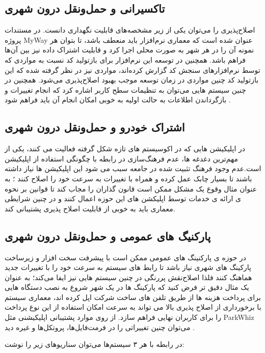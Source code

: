 \subsection{تاکسیرانی و حمل‌و‌نقل درون شهری}

اصلاح‌پذیری را می‌توان یکی از زیر مشخصه‌های قابلیت‌‌ نگهداری دانست. در مستندات پروژه MyWay عنوان شده است که معماری نرم‌افزار باید منعطف باشد، تا بتوان هر نمونه آن را در هر شهر به صورت محلی اجرا کرد و قابلیت اشتراک داده نیز بین آن‌‌ها فراهم باشد.
همچنین در توسعه این نرم‌افزار برای باز‌تولید کد نسبت به مواردی که توسط نرم‌افزارهای سنجش کد گزارش کرده‌اند، مواردی نیز در نظر گرفته شده که این باز‌تولید کد چنین مواردی در زمان توسعه موجب بهبود اصلاح‌پذیری می‌شود.
همچنین در چنین سیستم هایی می‌توان به تنظیمات سطح کاربر اشاره کرد که انجام تغییرات و بازگرداندن اطلاعات به حالت اولیه به خوبی امکان انجام آن باید فراهم شود \cite{myway_req}.

\subsection{اشتراک خودرو و حمل‌و‌نقل درون شهری}
در اپلیکیشن هایی که در اکوسیستم های تازه شکل گرفته فعالیت می کنند، یکی از مهم‌ترین دغدغه ها، عدم فرهنگ‌سازی در رابطه با چگونگی استفاده از اپلیکیشن است.عدم وجود فرهنگ تثبیت شده در جامعه سبب می شود این اپلیکیشن ها نیاز داشته باشند تا بسیار چابک عمل کرده و همراه با تغییرات به سرعت خود را اصلاح کنند \cite{carpool_dis}؛ به عنوان مثال وقوع یک مشکل ممکن است قانون گذاران را مجاب کند تا قوانین بر نحوه ی ارائه ی خدمات توسط اپلیکشن های این حوزه اعمال کنند و در چنین شرایطی معماری باید به خوبی از قابلیت اصلاح پذیری پشتیبانی کند. 


\subsection{پارکنیگ های عمومی و حمل‌و‌نقل درون شهری}
در حوزه ی پارکنینگ های عمومی ممکن است با پیشرفت سخت افزار و زیر‌ساخت پارکینگ های شهری نیاز باشد تا رابط های سیستم به سرعت خود را با تغییرات جدید هماهنگ کنند فلذا اصلاح‌نقش پررنگی در چنین سیستم هایی نیز ایفا می‌کند؛ به عنوان یک مثال دقیق تر فرض کنید که پارکینگ ها در یک شهر شروع به نصب دستگاه هایی برای پرداخت هزینه ها از طریق تلفن های ساخت شرکت اپل کرده اند، معماری سیستم با برخورداری از اصلاح پذیری بالا می تواند به سرعت امکان استفاده از این نوع پرداخت را برای کاربران نهایی فراهم سازد.
از روی موارد پشتیبانی اپلیکیشنی مثل ParkWhiz می‌توان چنین تغییراتی را در فرمت‌فایل‌ها، پروتکل‌ها و غیره دید \cite{support_term_parkwhiz}.


در رابطه با هر ۳ سیستم‌ها می‌توان سناریو‌های زیر را نوشت:

